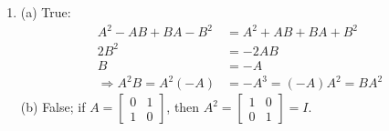 \documentclass[a4paper, 12pt]{article}
\begin{document}
\begin{enumerate}
		\item (a) True:
		\begin{align*}
		A^2 - AB + BA - B^2 &= A^2 + AB + BA + B^2 \\
		2B^2 &= -2AB \\
		B &= -A \\
		\Rightarrow A^2B = A^2(-A) &= -A^3 = (-A)A^2 = BA^2
		\end{align*}
		(b) False; if $A = \left[ \begin{array}{cc}
		0 & 1 \\
		1 & 0 \end{array} \right]$, then
		$A^2 = \left[ \begin{array}{cc}
		1 & 0 \\
		0 & 1 \end{array} \right] = I$.
		

\end{enumerate}
\end{document}
